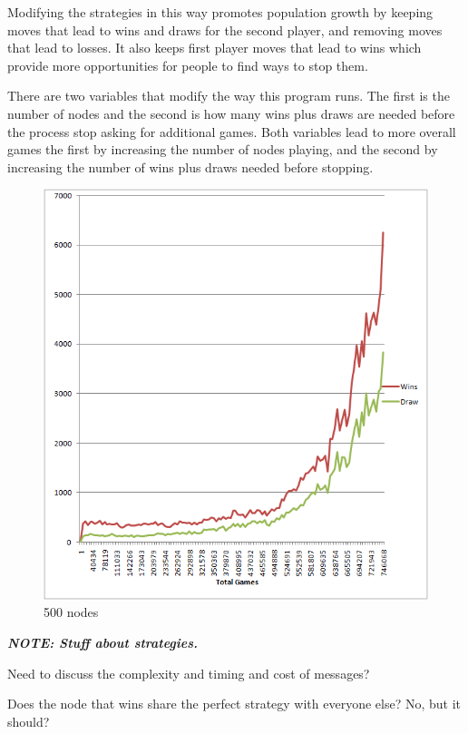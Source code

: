 \documentclass[11pt,twocolumn]{article}
\begin{document}
Modifying the strategies in this way promotes population growth by keeping moves that lead to wins and draws for the second player, and removing moves that lead to losses.  It also keeps first player moves that lead to wins which provide more opportunities for people to find ways to stop them.  

There are two variables that modify the way this program runs.  The first is the number of nodes and the second is how many wins plus draws are needed before the process stop asking for additional games.  Both variables lead to more overall games the first by increasing the number of nodes playing, and the second by increasing the number of wins plus draws needed before stopping.

\begin{figure}[h]
\centering
\includegraphics[keepaspectratio=true,scale=0.85]{500nodes_winsdrawpergames.png}
\caption{500 nodes}
\label{fig:500nodes_windraw}
\end{figure}

{\bf {\em NOTE: Stuff about strategies.}}

Need to discuss the complexity and timing and cost of messages? 

Does the node that wins share the perfect strategy with everyone else? No, but it should?
\end{document}
